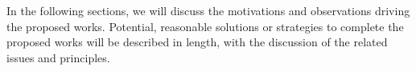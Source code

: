 


In the following sections, we will discuss the motivations and observations
driving the proposed works.
Potential, reasonable solutions or strategies
to complete the proposed works
will be described in length, with the discussion of the related issues and principles.


\label{sec:future:independence}

